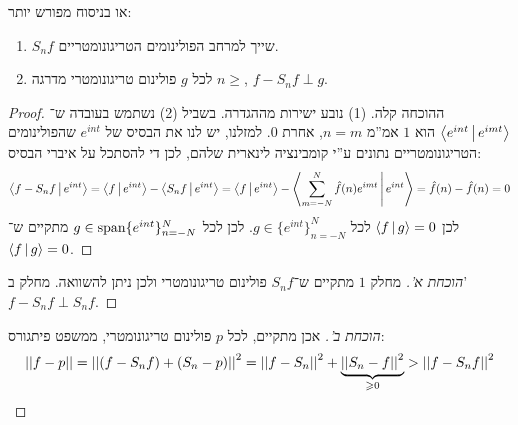 \documentclass[name=רשימות חדו''א 2א]{../../../tex/classes/noChapterMegasumPreamble}
\begin{document}
	או בניסוח מפורש יותר:
	\begin{enumerate}[(1)]
		\item $S_nf$ שייך למרחב הפולינומים הטריגונומטריים.
		\item לכל $g$ פולינום טריגונומטרי מדרגה $n \ge$, $f - S_nf \perp g$.
	\end{enumerate}
	\begin{proof}
		ההוכחה קלה. (1) נובע ישירות מההגדרה. בשביל (2) נשתמש בעובדה ש־$\left \langle e^{int} \,\middle|\, e^{imt} \right \rangle$ הוא $1$ אמ''מ $n = m$, אחרת $0$. למזלנו, יש לנו את הבסיס של $e^{int}$ שהפולינומים הטריגונומטריים נתונים ע''י קומבינציה לינארית שלהם, לכן די להסתכל על איברי הבסיס:
		\[ \left \langle f - S_nf \,\middle|\, e^{int} \right \rangle = \left \langle f \,\middle|\, e^{int} \right \rangle - \left \langle S_nf \,\middle|\, e^{int} \right \rangle = \left \langle f \,\middle|\, e^{int} \right \rangle - \left \langle \sum_{m = -N}^{N}\hat f(n)e^{imt} \,\middle|\, e^{int} \right \rangle = \hat f(n) - \hat f(n) = 0 \]
		לכן $\left \langle f \,\middle|\, g \right \rangle = 0$ לכל $g \in \{e^{int}\}_{n = -N}^{N}$. לכן לכל $g \in \operatorname{span}\{e^{int}\}_{n = -N}^{N}$ מתקיים ש־$\left \langle f \,\middle|\, g \right \rangle = 0$.
	\end{proof}
	\begin{proof}[הוכחת א']
		מחלק $1$ מתקיים ש־$S_nf$ פולינום טריגונומטרי ולכן ניתן להשוואה. מחלק ב' $f - S_nf \perp S_nf$.
	\end{proof}\begin{proof}[הוכחת ב']
		אכן מתקיים, לכל $p$ פולינום טריגונומטרי, ממשפט פיתגורס:
		\[ \left \vert \left \vert f - p \right \vert \right \vert = \left \vert \left \vert (f - S_nf) + (S_n - p) \right \vert \right \vert^{2} = \left \vert \left \vert f - S_n \right \vert \right \vert^{2} + \underbrace{\left \vert \left \vert S_n - f \right \vert \right \vert^{2}}_{\geqslant 0} > \left \vert \left \vert f - S_nf \right \vert \right \vert^{2} \]
	\end{proof}
\end{document}
